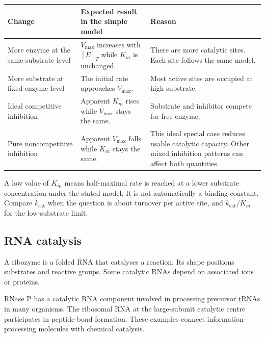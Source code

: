 \documentclass[12pt,a4paper]{article}
\begin{document}
\par\vspace{6pt}
\noindent\begin{tabularx}{\linewidth}{|B{3.3cm}|Y|Y|}
\hline
\textbf{Change} & \textbf{Expected result in the simple model} & \textbf{Reason} \\ \hline
More enzyme at the same substrate level & $V_{\max}$ increases with $[E]_T$ while $K_m$ is unchanged. & There are more catalytic sites. Each site follows the same model. \\ \hline
More substrate at fixed enzyme level & The initial rate approaches $V_{\max}$. & Most active sites are occupied at high substrate. \\ \hline
Ideal competitive inhibition & Apparent $K_m$ rises while $V_{\max}$ stays the same. & Substrate and inhibitor compete for free enzyme. \\ \hline
Pure noncompetitive inhibition & Apparent $V_{\max}$ falls while $K_m$ stays the same. & This ideal special case reduces usable catalytic capacity. Other mixed inhibition patterns can affect both quantities. \\ \hline
\end{tabularx}\par

\begin{tcolorbox}[masonbox, title={Connect structure to the kinetics}]
A low value of $K_m$ means half-maximal rate is reached at a lower substrate concentration under the stated model. It is not automatically a binding constant. Compare $k_{\mathrm{cat}}$ when the question is about turnover per active site, and $k_{\mathrm{cat}}/K_m$ for the low-substrate limit.
\end{tcolorbox}

\subsection{RNA catalysis}
\begin{tcolorbox}[defbox, title={Ribozyme}]
A ribozyme is a folded RNA that catalyses a reaction. Its shape positions substrates and reactive groups. Some catalytic RNAs depend on associated ions or proteins.
\end{tcolorbox}

RNase P has a catalytic RNA component involved in processing precursor tRNAs in many organisms. The ribosomal RNA at the large-subunit catalytic centre participates in peptide-bond formation. These examples connect information-processing molecules with chemical catalysis.
\end{document}
